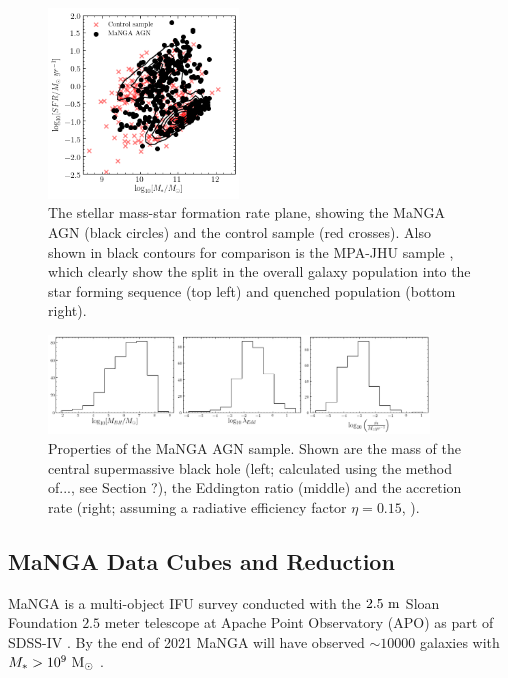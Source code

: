 \documentclass[useAMS,usenatbib]{mn2e}
\begin{document}
\begin{figure}\label{fig:confidencecheck}
\includegraphics[width=0.45\textwidth]{../data/ellison/figures/manga_agn_SFS_plane.png}
\caption{The stellar mass-star formation rate plane, showing the MaNGA AGN (black circles) and the control sample (red crosses). Also shown in black contours for comparison is the MPA-JHU sample \citep{brinchmann04}, which clearly show the split in the overall galaxy population into the star forming sequence (top left) and quenched population (bottom right).}
\end{figure}


\begin{figure}\label{fig:agnprop}
\includegraphics[width=0.9\textwidth]{../data/ellison/figures/mangaagn_sample_agn_properties.png}
\caption{Properties of the MaNGA AGN sample. Shown are the mass of the central supermassive black hole (left; calculated using the method of..., see Section ?), the Eddington ratio (middle) and the accretion rate (right; assuming a radiative efficiency factor $\eta=0.15$, \citealt{elvis02}).}
\end{figure}

\subsection{MaNGA Data Cubes and Reduction}

MaNGA is a multi-object IFU survey conducted with the $2.5~\rm{m}$ Sloan Foundation $2.5$ meter telescope \citep{gunn06} at Apache Point Observatory (APO) as part of SDSS-IV \citep{blanton17}. By the end of 2021 MaNGA will have observed $\sim10000$ galaxies with $M_* > 10^9~\rm{M}_{\odot}$ \citep[see][for details]{wake17}. 
\end{document}
